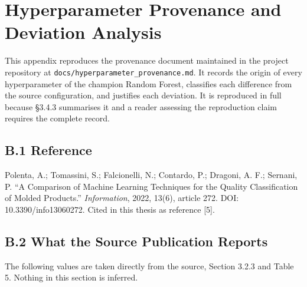 \hypertarget{hyperparameter-provenance-and-deviation-analysis}{%
\chapter{Hyperparameter Provenance and Deviation Analysis}\label{hyperparameter-provenance-and-deviation-analysis}}

This appendix reproduces the provenance document maintained in the project repository at \texttt{docs/hyperparameter\_provenance.md}. It records the origin of every hyperparameter of the champion Random Forest, classifies each difference from the source configuration, and justifies each deviation. It is reproduced in full because §3.4.3 summarises it and a reader assessing the reproduction claim requires the complete record.

\hypertarget{b.1-reference}{%
\section{B.1 Reference}\label{b.1-reference}}

Polenta, A.; Tomassini, S.; Falcionelli, N.; Contardo, P.; Dragoni, A. F.; Sernani, P. ``A Comparison of Machine Learning Techniques for the Quality Classification of Molded Products.'' \emph{Information}, 2022, 13(6), article 272. DOI: 10.3390/info13060272. Cited in this thesis as reference {[}5{]}.

\hypertarget{b.2-what-the-source-publication-reports}{%
\section{B.2 What the Source Publication Reports}\label{b.2-what-the-source-publication-reports}}

The following values are taken directly from the source, Section 3.2.3 and Table 5. Nothing in this section is inferred.

